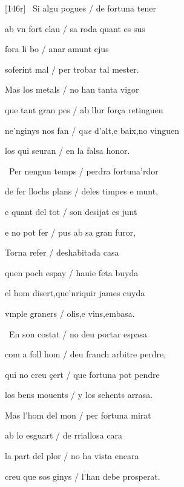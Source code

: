 \documentclass[12pt]{article}
\begin{document}
\begin{estrofa}

 [146r] \textparagraph\  Si algu pogues / de fortuna tener

 ab vn fort clau / sa roda quant es sus

 fora li bo / anar amunt ejus

 soferint mal / per trobar tal mester.

 Mas los metals / no han tanta vigor

 que tant gran pes / ab llur for\c{c}a retinguen

 ne'nginys nos fan / q\textit{ue} d'alt,e baix,no vinguen

 los qui seuran / en la falsa honor.

\end{estrofa}



\begin{estrofa}

 \textparagraph\  Per nengun temps / perdra fortuna'rdor

 de fer llochs plans / deles timpes e munt,

 e quant del tot / son desijat es junt

 e no pot fer / pus ab sa gran furor,

 Torna refer / deshabitada casa

 quen poch espay / hauie feta buyda

 el hom disert,que'nriquir james cuyda

 vmple graners / olis,e vins,embasa.

\end{estrofa}



\begin{estrofa}

 \textparagraph\  En son costat / no deu portar espasa

 com a foll hom / deu franch arbitre perdre,

 qui no creu \c{c}ert / que fortuna pot pendre

 los bens mouents / y los sehents arrasa.

 Mas l'hom del mon / per fortuna mirat

 ab lo esguart / de rriallosa cara

 la part del plor / no ha vista encara

 creu que sos ginys / l'han debe prosperat.

\end{estrofa}
\end{document}
